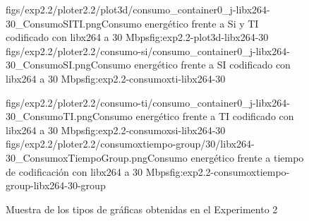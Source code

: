  \begin{figure}[H]
   \dosubfigs
        {figs/exp2.2/ploter2.2/plot3d/consumo_container0_j-libx264-30_ConsumoSITI.png}{Consumo energético frente a Si y TI codificado con libx264 a 30 Mbps}{fig:exp2.2-plot3d-libx264-30}
        {figs/exp2.2/ploter2.2/consumo-si/consumo_container0_j-libx264-30_ConsumoSI.png}{Consumo energético frente a SI codificado con libx264 a 30 Mbps}{fig:exp2.2-consumoxti-libx264-30}

  \dosubfigs
        {figs/exp2.2/ploter2.2/consumo-ti/consumo_container0_j-libx264-30_ConsumoTI.png}{Consumo energético frente a TI codificado con libx264 a 30 Mbps}{fig:exp2.2-consumoxsi-libx264-30}
        {figs/exp2.2/ploter2.2/consumoxtiempo-group/30/libx264-30_ConsumoxTiempoGroup.png}{Consumo energético frente a tiempo de codificación con libx264 a 30 Mbps}{fig:exp2.2-consumoxtiempo-group-libx264-30-group}
 \caption{Muestra de los tipos de gráficas obtenidas en el Experimento 2}
 \label{fig:resul-exp2}
\end{figure}